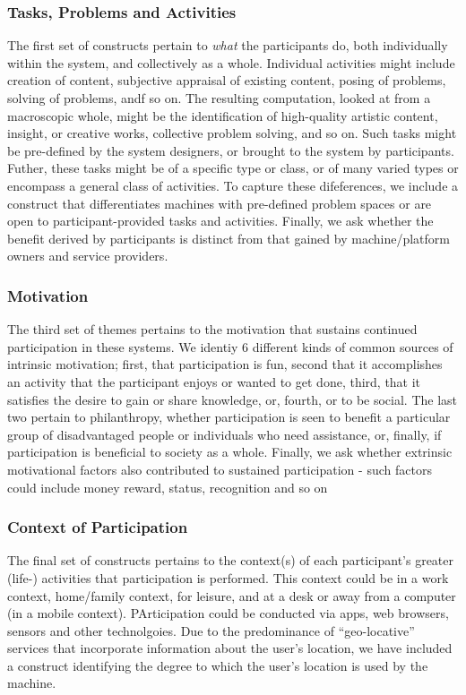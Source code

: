 \documentclass{sig-alternate}
\begin{document}
\subsubsection{Tasks, Problems and Activities}
The first set of constructs pertain to \emph{what} the participants
do, both individually within the system, and collectively as a whole.
Individual activities might include creation of content, subjective
appraisal of existing content, posing of problems, solving of
problems, andf so on.  The resulting computation, looked at from a
macroscopic whole, might be the identification of high-quality
artistic content, insight, or creative works, collective problem
solving, and so on.  Such tasks might be pre-defined by the system
designers, or brought to the system by participants.  Futher, these
tasks might be of a specific type or class, or of many varied types or
encompass a general class of activities.  To capture these
difeferences, we include a construct that differentiates machines with
pre-defined problem spaces or are open to participant-provided tasks
and activities.  Finally, we ask whether the benefit derived by
participants is distinct from that gained by machine/platform owners
and service providers.

\subsubsection{Motivation}
The third set of themes pertains to the motivation that sustains
continued participation in these systems.  We identiy 6 different
kinds of common sources of intrinsic motivation; first, that
participation is fun, second that it accomplishes an activity that the
participant enjoys or wanted to get done, third, that it satisfies the
desire to gain or share knowledge, or, fourth, or to be social.  The
last two pertain to philanthropy, whether participation is seen to
benefit a particular group of disadvantaged people or individuals who
need assistance, or, finally, if participation is beneficial to
society as a whole.  Finally, we ask whether extrinsic motivational
factors also contributed to sustained participation - such factors
could include money reward, status, recognition and so on

\subsubsection{Context of Participation}
The final set of constructs pertains to the context(s) of each
participant's greater (life-) activities that participation is
performed.  This context could be in a work context, home/family
context, for leisure, and at a desk or away from a computer (in a
mobile context).  PArticipation could be conducted via apps, web
browsers, sensors and other technolgoies.  Due to the predominance of
``geo-locative'' services that incorporate information about the
user's location, we have included a construct identifying the degree
to which the user's location is used by the machine.
\end{document}

